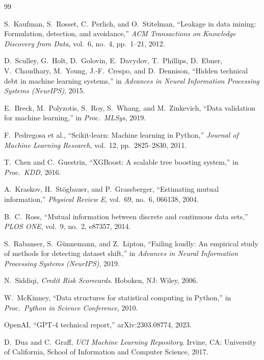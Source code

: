 \documentclass[12pt,a4paper]{report}
\begin{document}

\begin{thebibliography}{99}

S.~Kaufman, S.~Rosset, C.~Perlich, and O.~Stitelman,
``Leakage in data mining: Formulation, detection, and avoidance,''
\textit{ACM Transactions on Knowledge Discovery from Data}, vol.~6, no.~4, pp.~1--21, 2012.

D.~Sculley, G.~Holt, D.~Golovin, E.~Davydov, T.~Phillips, D.~Ebner,
V.~Chaudhary, M.~Young, J.-F.~Crespo, and D.~Dennison,
``Hidden technical debt in machine learning systems,''
in \textit{Advances in Neural Information Processing Systems (NeurIPS)}, 2015.

E.~Breck, M.~Polyzotis, S.~Roy, S.~Whang, and M.~Zinkevich,
``Data validation for machine learning,''
in \textit{Proc.\ MLSys}, 2019.

F.~Pedregosa et al.,
``Scikit-learn: Machine learning in Python,''
\textit{Journal of Machine Learning Research}, vol.~12, pp.~2825--2830, 2011.

T.~Chen and C.~Guestrin,
``XGBoost: A scalable tree boosting system,''
in \textit{Proc.\ KDD}, 2016.

A.~Kraskov, H.~St\"{o}gbauer, and P.~Grassberger,
``Estimating mutual information,''
\textit{Physical Review E}, vol.~69, no.~6, 066138, 2004.

B.~C.~Ross,
``Mutual information between discrete and continuous data sets,''
\textit{PLOS ONE}, vol.~9, no.~2, e87357, 2014.

S.~Rabanser, S.~G\"{u}nnemann, and Z.~Lipton,
``Failing loudly: An empirical study of methods for detecting dataset shift,''
in \textit{Advances in Neural Information Processing Systems (NeurIPS)}, 2019.

N.~Siddiqi,
\textit{Credit Risk Scorecards}.
Hoboken, NJ: Wiley, 2006.

W.~McKinney,
``Data structures for statistical computing in Python,''
in \textit{Proc.\ Python in Science Conference}, 2010.

OpenAI,
``GPT-4 technical report,''
arXiv:2303.08774, 2023.

D.~Dua and C.~Graff,
\textit{UCI Machine Learning Repository}.
Irvine, CA: University of California, School of Information and Computer Science, 2017.


\end{thebibliography}
\end{document}
